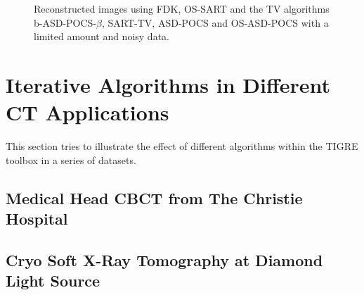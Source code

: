 \begin{figure}
\begin{tikzpicture}
\end{tikzpicture}
\caption[Reconstructed images using TV algorithms]{\label{fig:TVXCAT}Reconstructed images using FDK, OS-SART and the TV algorithms b-ASD-POCS-$\beta$, SART-TV,  ASD-POCS and OS-ASD-POCS with a limited amount and noisy data.}
\end{figure}


\begin{table}
\begin{center}
\caption{NRMSE for the reconstructed images in figure XX}
\label{tab:NRMSE TVs}
\end{center}
\end{table}
















\FloatBarrier
\section{Iterative Algorithms in Different CT Applications}
This section tries to illustrate the effect of different algorithms within the TIGRE toolbox in a series of datasets. 
\subsection{Medical Head CBCT from  The Christie Hospital}
\subsection{Cryo Soft X-Ray Tomography at Diamond Light Source}

